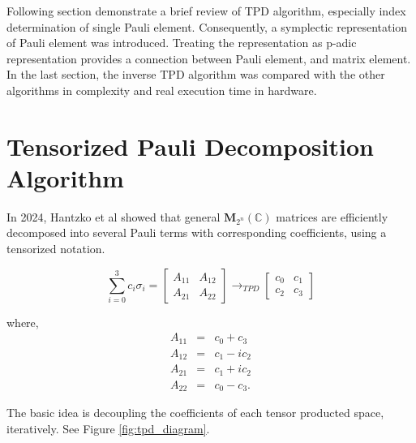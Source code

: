 \documentclass[twocolumn]{article}
\begin{document}
Following section demonstrate a brief review of TPD algorithm, especially
index determination of single Pauli element. 
Consequently, a symplectic representation of Pauli element was introduced.
Treating the representation as p-adic representation provides a connection between Pauli element, and matrix element.
In the last section, the inverse TPD algorithm was compared with 
the other algorithms in complexity and real execution time in hardware.

\section{Tensorized Pauli Decomposition Algorithm}

In 2024, Hantzko et al showed that 
general $\mathbf{M}_{2^n}(\mathbb{C})$ matrices are efficiently decomposed into 
several Pauli terms with corresponding coefficients, using a tensorized notation\cite{Hantzko_2024}.

\begin{equation}
    \sum_{i=0}^3 c_i \sigma_i = 
    \begin{bmatrix}
        A_{11} & A_{12}\\
        A_{21} & A_{22}
    \end{bmatrix}
    \rightarrow_{TPD}
    \begin{bmatrix}
        c_0 & c_1\\
        c_2 & c_3
    \end{bmatrix}
\end{equation}

where, 
\begin{equation}
    \label{eq:tpd_transform}
    \begin{array}{ccc}
        A_{11} & = &  c_0 + c_3\\
        A_{12} & = &  c_1 - i c_2\\
        A_{21} & = &  c_1 + i c_2\\
        A_{22} & = &  c_0 - c_3.
    \end{array}
\end{equation}

The basic idea is decoupling the coefficients of each tensor producted space, iteratively. 
See Figure \ref{fig:tpd_diagram}.
\end{document}
